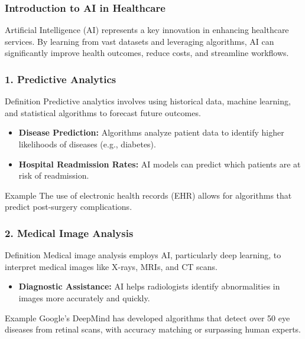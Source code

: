 \documentclass[aspectratio=169]{beamer}
\begin{document}
\begin{frame}[fragile]
    \frametitle{Introduction to AI in Healthcare}
    Artificial Intelligence (AI) represents a key innovation in enhancing healthcare services. By learning from vast datasets and leveraging algorithms, AI can significantly improve health outcomes, reduce costs, and streamline workflows.
\end{frame}

\begin{frame}[fragile]
    \frametitle{1. Predictive Analytics}
    \begin{block}{Definition}
        Predictive analytics involves using historical data, machine learning, and statistical algorithms to forecast future outcomes.
    \end{block}
    
    \begin{itemize}
        \item \textbf{Disease Prediction:} Algorithms analyze patient data to identify higher likelihoods of diseases (e.g., diabetes).
        \item \textbf{Hospital Readmission Rates:} AI models can predict which patients are at risk of readmission.
    \end{itemize}
    
    \begin{block}{Example}
        The use of electronic health records (EHR) allows for algorithms that predict post-surgery complications.
    \end{block}
\end{frame}

\begin{frame}[fragile]
    \frametitle{2. Medical Image Analysis}
    \begin{block}{Definition}
        Medical image analysis employs AI, particularly deep learning, to interpret medical images like X-rays, MRIs, and CT scans.
    \end{block}
    
    \begin{itemize}
        \item \textbf{Diagnostic Assistance:} AI helps radiologists identify abnormalities in images more accurately and quickly.
    \end{itemize}
    
    \begin{block}{Example}
        Google’s DeepMind has developed algorithms that detect over 50 eye diseases from retinal scans, with accuracy matching or surpassing human experts.
    \end{block}
\end{frame}
\end{document}
